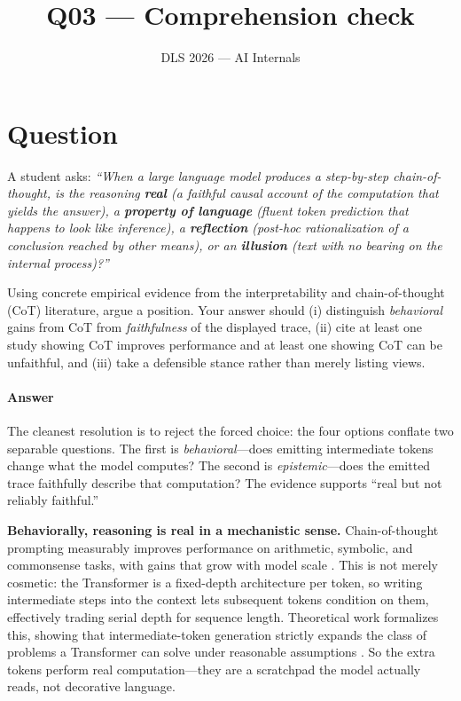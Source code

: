 \documentclass[11pt]{article}
\title{Q03 --- Comprehension check}
\author{DLS 2026 --- AI Internals}
\date{}
\begin{document}
\maketitle

\section*{Question}

A student asks: \emph{``When a large language model produces a step-by-step
chain-of-thought, is the reasoning \textbf{real} (a faithful causal account of
the computation that yields the answer), a \textbf{property of language}
(fluent token prediction that happens to look like inference), a
\textbf{reflection} (post-hoc rationalization of a conclusion reached by other
means), or an \textbf{illusion} (text with no bearing on the internal
process)?''}

Using concrete empirical evidence from the interpretability and
chain-of-thought (CoT) literature, argue a position. Your answer should (i)
distinguish \emph{behavioral} gains from CoT from \emph{faithfulness} of the
displayed trace, (ii) cite at least one study showing CoT improves performance
and at least one showing CoT can be unfaithful, and (iii) take a defensible
stance rather than merely listing views.

\paragraph{Answer}
The cleanest resolution is to reject the forced choice: the four options
conflate two separable questions. The first is \emph{behavioral}---does
emitting intermediate tokens change what the model computes? The second is
\emph{epistemic}---does the emitted trace faithfully describe that computation?
The evidence supports ``real but not reliably faithful.''

\textbf{Behaviorally, reasoning is real in a mechanistic sense.} Chain-of-thought
prompting measurably improves performance on arithmetic, symbolic, and
commonsense tasks, with gains that grow with model scale
\citep{wei2022cot,kojima2022zeroshot}. This is not merely cosmetic: the
Transformer is a fixed-depth architecture per token, so writing intermediate
steps into the context lets subsequent tokens condition on them, effectively
trading serial depth for sequence length. Theoretical work formalizes this,
showing that intermediate-token generation strictly expands the class of
problems a Transformer can solve under reasonable assumptions
\citep{merrill2024expressive,feng2023towards}. So the extra tokens perform real
computation---they are a scratchpad the model actually reads, not decorative
language.
\end{document}
